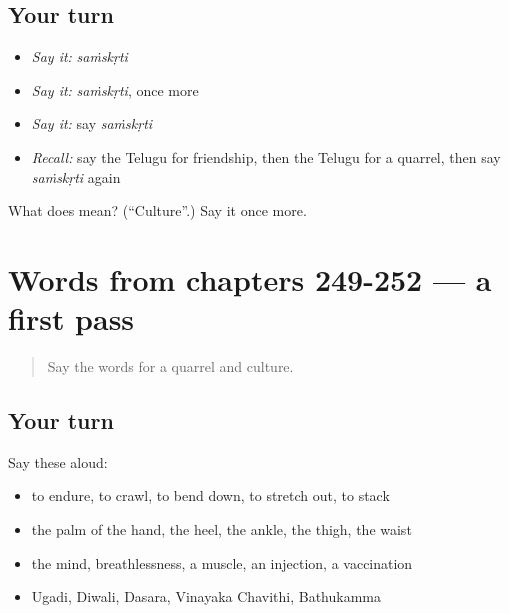 \subsection*{Your turn}
\begin{itemize}
\raggedright
  \item \emph{Say it:} \emph{saṁskṛti}
  \item \emph{Say it:} \emph{saṁskṛti}, once more
  \item \emph{Say it:} say \emph{saṁskṛti}
  \item \emph{Recall:} say the Telugu for friendship, then the Telugu for a quarrel, then say \emph{saṁskṛti} again
\end{itemize}

\begin{tcolorbox}[breakable,colback=teal!4,colframe=teal!35!black,title={Before you move on}]
What does  mean? (\textquotedblleft{}Culture\textquotedblright{}.) Say it once more.
\end{tcolorbox}
\section[(dialogue)]{Words from chapters 249-252 — a first pass}

\label{lesson:TE-R257-first-pass-words-from-chapters-249-252}



\begin{quote}
Say the words for a quarrel and culture.
\end{quote}

\subsection*{Your turn}
Say these aloud:

\begin{itemize}
\raggedright
  \item to endure, to crawl, to bend down, to stretch out, to stack
  \item the palm of the hand, the heel, the ankle, the thigh, the waist
  \item the mind, breathlessness, a muscle, an injection, a vaccination
  \item Ugadi, Diwali, Dasara, Vinayaka Chavithi, Bathukamma
\end{itemize}

